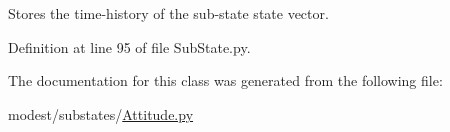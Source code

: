 Stores the time-\/history of the sub-\/state state vector. 



Definition at line 95 of file Sub\+State.\+py.



The documentation for this class was generated from the following file\+:\begin{DoxyCompactItemize}
\item 
modest/substates/\hyperlink{Attitude_8py}{Attitude.\+py}\end{DoxyCompactItemize}
